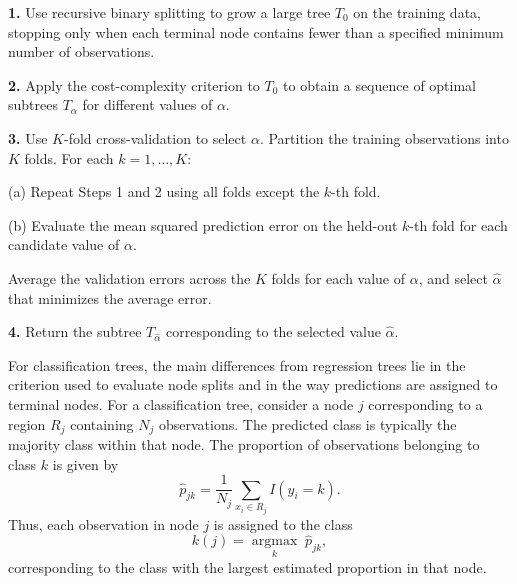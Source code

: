\begin{algorithm}[H]
\caption{Construction and pruning of a regression tree
\cite{james2021introduction}.}
\label{alg:algo-buildtree}
\begin{algorithmic}[1]

\State \textbf{1.} Use recursive binary splitting to grow a large tree
$T_0$ on the training data, stopping only when each terminal node
contains fewer than a specified minimum number of observations.

\State \textbf{2.} Apply the cost-complexity criterion to $T_0$ to obtain
a sequence of optimal subtrees $T_{\alpha}$ for different values of
$\alpha$.

\State \textbf{3.} Use $K$-fold cross-validation to select $\alpha$.
Partition the training observations into $K$ folds. For each
$k=1,\ldots,K$:

\State \hspace{1em} (a) Repeat Steps 1 and 2 using all folds except the
$k$-th fold.

\State \hspace{1em} (b) Evaluate the mean squared prediction error on the
held-out $k$-th fold for each candidate value of $\alpha$.

\State \hspace{1em} Average the validation errors across the $K$ folds for
each value of $\alpha$, and select $\hat{\alpha}$ that minimizes the
average error.

\State \textbf{4.} Return the subtree $T_{\hat{\alpha}}$ corresponding to
the selected value $\hat{\alpha}$.

\end{algorithmic}
\end{algorithm}

For classification trees, the main differences from regression trees lie
in the criterion used to evaluate node splits and in the way predictions
are assigned to terminal nodes. For a classification tree, consider a node
$j$ corresponding to a region $R_j$ containing $N_j$ observations. The
predicted class is typically the majority class within that node. The
proportion of observations belonging to class $k$ is given by
\begin{equation}
\hat{p}_{jk}
=
\frac{1}{N_j}
\sum_{x_i \in R_j}
I\left(y_i=k\right).
\end{equation}
Thus, each observation in node $j$ is assigned to the class
\begin{equation}
k(j)
=
\underset{k}{\operatorname{argmax}}\;\hat{p}_{jk},
\end{equation}
corresponding to the class with the largest estimated proportion in that
node.

